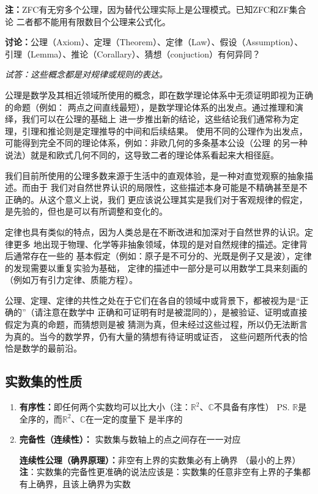 \begin{shaded}
	{\bf 注：}ZFC有无穷多个公理，因为替代公理实际上是公理模式。已知ZFC和ZF集合论
	二者都不能用有限数目个公理来公式化。
	
	{\bf 讨论：}公理（Axiom）、定理（Theorem）、定律（Law）、假设（Assumption）、
	引理（Lemma）、推论（Corallary）、猜想（conjuction）有何异同？
	
	{\it 试答：这些概念都是对规律或规则的表达。
	
	公理是数学及其相近领域所使用的概念，即在数学理论体系中无须证明即视为正确的命题（例如：
	两点之间直线最短），是数学理论体系的出发点。通过推理和演绎，我们可以在公理的基础上
	进一步推出新的结论，这些结论我们通常称为定理，引理和推论则是定理推导的中间和后续结果。
	使用不同的公理作为出发点，可能得到完全不同的理论体系，例如：非欧几何的多条基本公设（公理
	的另一种说法）就是和欧式几何不同的，这导致二者的理论体系看起来大相径庭。
	
	我们目前所使用的公理多数来源于生活中的直观体验，是一种对直觉观察的抽象描述。而由于
	我们对自然世界认识的局限性，这些描述本身可能是不精确甚至是不正确的。从这个意义上说，我们
	更应该说公理其实是我们对于客观规律的假定，是先验的，但也是可以有所调整和变化的。
	
	定律也具有类似的特点，因为人类总是在不断改进和加深对于自然世界的认识。定律更多
	地出现于物理、化学等非抽象领域，体现的是对自然规律的描述。定律背后通常存在一些的
	基本假定（例如：原子是不可分的、光既是例子又是波），定律的发现需要以重复实验为基础，
	定律的描述中一部分是可以用数学工具来刻画的（例如万有引力定律、质能方程）。
	
	公理、定理、定律的共性之处在于它们在各自的领域中或背景下，都被视为是“正确的”（请注意在数学中
	正确和可证明有时是被混同的），是被验证、证明或直接假定为真的命题，而猜想则是被
	猜测为真，但未经过这些过程，所以仍无法断言为真的。当今的数学界，仍有大量的猜想有待证明或证否，
	这些问题所代表的恰恰是数学的最前沿。
	}
\end{shaded}
	
\subsection{实数集的性质}
	\begin{enumerate} 
	  \item {\bf 有序性：}即任何两个实数均可以比大小\quad （注：$\mathbb{R}^2$、$\mathbb{C}$不具备有序性） 
	  \ps{$\mathbb{R}$是全序的，而$\mathbb{R}^2$、$\mathbb{C}$在一定的度量下
	  是半序的}
	  \item {\bf 完备性（连续性）： }实数集与数轴上的点之间存在一一对应
	  
	  {\bf{连续性公理（确界原理）：}}非空有{上界}的实数集必有{上确界} （最小的上界）\\
	  {\bf 注}：实数集的完备性更准确的说法应该是：实数集的任意非空有上界的子集都有上确界，且该上确界为实数
	\end{enumerate}
	
